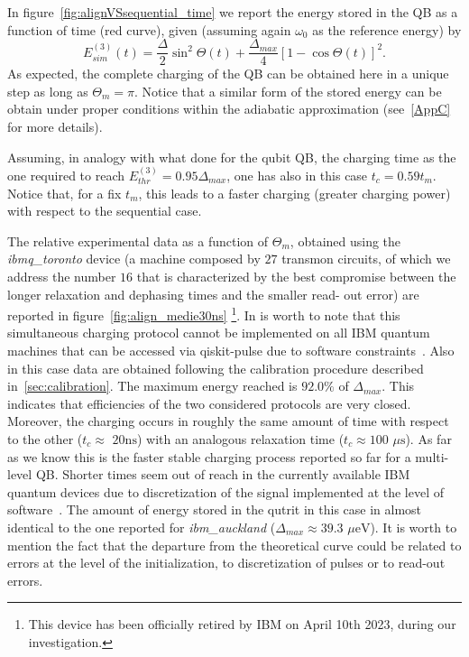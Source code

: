\documentclass[12pt]{iopart}
\begin{document}
In figure~\ref{fig:alignVSsequential_time} we report the energy stored in the QB as a function of time (red curve), given (assuming again $\omega_{0}$ as the reference energy) by
\begin{equation}
    E^{(3)}_{sim}(t)=\frac{\Delta}{2}\sin^{2}\Theta(t)+\frac{\Delta_{max}}{4}\left[1-\cos\Theta(t)\right]^2.
    \label{E_sim}
\end{equation}
As expected, the complete charging of the QB can be obtained here in a unique step as long as $\Theta_{m}=\pi$. Notice that a similar form of the stored energy can be obtain under proper conditions within the adiabatic approximation (see~\ref{AppC} for more details). 

Assuming, in analogy with what done for the qubit QB, the charging time as the one required to reach $E^{(3)}_{thr}=0.95\Delta_{max}$, one has also in this case $t_{c}=0.59t_m$. Notice that, for a fix $t_m$, this leads to a faster charging (greater charging power) with respect to the sequential case. 

The relative experimental data as a function of $\Theta_{m}$, obtained using the \emph{ibmq\_toronto} device (a machine composed by $27$ transmon circuits, of which we address the number $16$ that is characterized by the best
compromise between the longer relaxation and dephasing times and the smaller read-
out error) are reported in figure~\ref{fig:align_medie30ns} \footnote{This device has been officially retired by IBM on April 10th 2023, during our investigation.}. In is worth to note that this simultaneous charging protocol cannot be implemented on all IBM quantum machines that can be accessed via qiskit-pulse due to software constraints~\cite{IBM_private}. Also in this case data are obtained following the calibration procedure described in~\ref{sec:calibration}. The maximum energy reached is $92.0\%$ of $\Delta_{max}$. This indicates that efficiencies of the two considered protocols are very closed. Moreover, the charging occurs in roughly the same amount of time with respect to the other ($t_{c}\approx\,\,20 \mathrm{ns}$) with an analogous relaxation time ($t_{c}\approx 100\,\,\mu\mathrm{s}$). As far as we know this is the faster stable charging process reported so far for a multi-level QB. Shorter times seem out of reach in the currently available IBM quantum devices due to discretization of the signal implemented at the level of software~\cite{Gemme22}. The amount of energy stored in the qutrit in this case in almost identical to the one reported for \emph{ibm\_auckland} ($\Delta_{max}\approx 39.3\,\,\mu\mathrm{eV}$). It is worth to mention the fact that the departure from the theoretical curve could be related to errors at the level of the initialization, to discretization of pulses or to read-out errors. 
\end{document}
